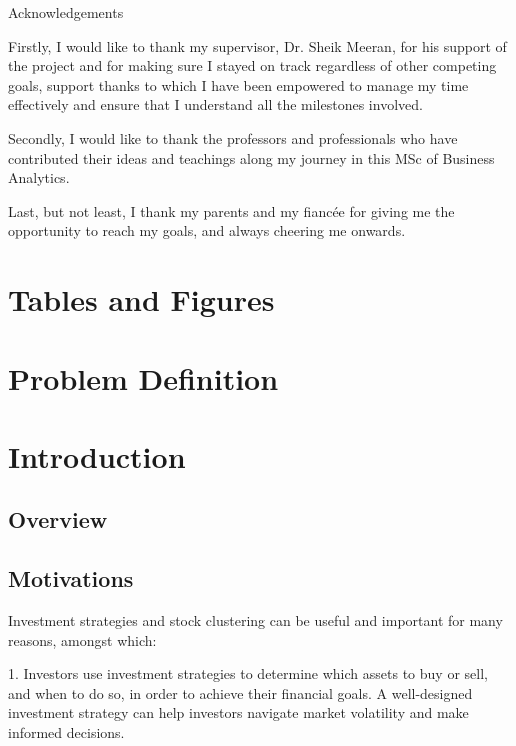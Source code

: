 \documentclass[12pt]{article}
\begin{document}
\newpage

\begin{center} {\LARGE Acknowledgements} \end{center}

Firstly, I would like to thank my supervisor, Dr. Sheik Meeran, for his support of the project and for making sure I stayed on track regardless of other competing goals, support thanks to which I have been empowered to manage my time effectively and ensure that I understand all the milestones involved.

Secondly, I would like to thank the professors and professionals who have contributed their ideas and teachings along my journey in this MSc of Business Analytics. 

Last, but not least, I thank my parents and my fiancée for giving me the opportunity to reach my goals, and always cheering me onwards.

\newpage

\tableofcontents

\newpage

\section{Tables and Figures}

\listoftables

\listoffigures

\listoflistings

\newpage

\section{Problem Definition}

\section{Introduction}

\subsection{Overview}

\subsection{Motivations}
Investment strategies and stock clustering can be useful and important for many reasons, amongst which: 

1. Investors use investment strategies to determine which assets to buy or sell, and when to do so, in order to achieve their financial goals. A well-designed investment strategy can help investors navigate market volatility and make informed decisions. 
\end{document}
